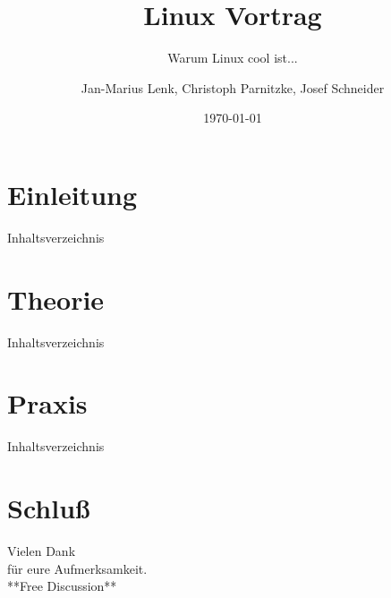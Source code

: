 \documentclass[12pt,utf8]{beamer}
\title{Linux Vortrag}
\subtitle{Warum Linux cool ist...}
\author[J.-M. Lenk, C. Parnitzke, J. Schneider]{Jan-Marius Lenk, Christoph Parnitzke, Josef Schneider}
\institute[FOSS AG - FbI]{Free and Open Source Software AG\\ Fachbereich Informatik}
\date{\today}
\begin{document}
\begin{frame}
	\titlepage
\end{frame}

\section{Einleitung}

\begin{frame}{Inhaltsverzeichnis}
\end{frame}




\section{Theorie}

\begin{frame}{Inhaltsverzeichnis}
\end{frame}




\section{Praxis}

\begin{frame}{Inhaltsverzeichnis}
\end{frame}




\section{Schluß}




\begin{frame}
\vfill
\begin{center}\begin{Huge}Vielen Dank \\
für eure Aufmerksamkeit. \\[50pt]
**Free Discussion**\end{Huge}\vfill
\end{center}
\vfill
\end{frame}
\end{document}
